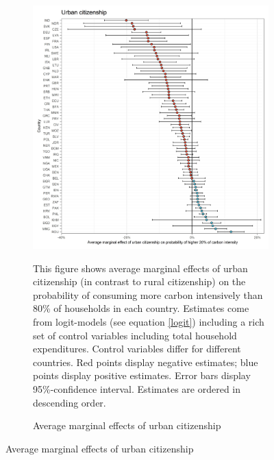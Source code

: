  \begin{figure}[ht!]\ContinuedFloat
   \centering
   \begin{subfigure}[b]{\textwidth}
   \centering
   \caption{Average marginal effects of urban citizenship} \label{fig:Logit_ME_urban}
   \includegraphics{1_Figures/Analysis_Logit_Models_Marginal_Effects/Average_Marginal_Effects_affected_upper_80_urban_01_2017.jpg}
   \begin{subcaption2}
     This figure shows average marginal effects of urban citizenship (in contrast to rural citizenship) on the probability of consuming more carbon intensively than 80\% of households in each country. Estimates come from logit-models (see equation \ref{logit}) including a rich set of control variables including total household expenditures. Control variables differ for different countries. Red points display negative estimates; blue points display positive estimates. Error bars display 95\%-confidence interval. Estimates are ordered in descending order.
   \end{subcaption2}
   \end{subfigure}
 \end{figure}
 \clearpage

